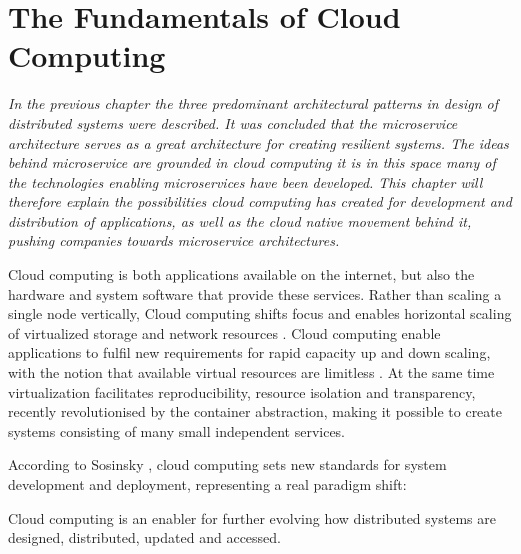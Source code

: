\chapter{The Fundamentals of Cloud Computing}
\label{ch:cloud_computing}

\textit{In the previous chapter the three predominant architectural patterns in design of distributed systems were described. It was concluded that the microservice architecture serves as a great architecture for creating resilient systems. The ideas behind microservice are grounded in cloud computing it is in this space many of the technologies enabling microservices have been developed. This chapter will therefore explain the possibilities cloud computing has created for development and distribution of applications, as well as the cloud native movement behind it, pushing companies towards microservice architectures.}

Cloud computing is both applications available on the internet, but also the hardware and system software that provide these services.
Rather than scaling a single node vertically, Cloud computing shifts focus and enables horizontal scaling of virtualized storage and network resources \cite{armbrust2010view}. Cloud computing enable applications to fulfil new requirements for rapid capacity up and down scaling, with the notion that available virtual resources are limitless \cite{sosinsky2010cloud}. At the same time virtualization facilitates reproducibility, resource isolation and transparency, recently revolutionised by the container abstraction, making it possible to create systems consisting of many small independent services. 

According to Sosinsky \cite[p. 3 ]{sosinsky2010cloud}, cloud computing sets new standards for system development and deployment, representing a real paradigm shift:


Cloud computing is an enabler for further evolving how distributed systems are designed, distributed, updated and accessed. 

